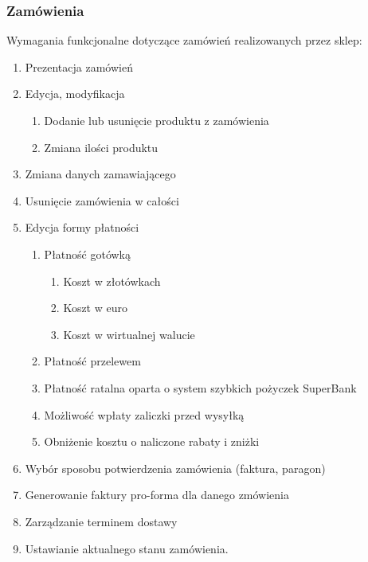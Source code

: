 \subsubsection{Zamówienia}

Wymagania funkcjonalne dotyczące zamówień realizowanych przez sklep:

\begin{enumerate}
  \item Prezentacja zamówień
  \item Edycja, modyfikacja
  \begin{enumerate}
    \item Dodanie lub usunięcie produktu z zamówienia
    \item Zmiana ilości produktu
  \end{enumerate}
  \item Zmiana danych zamawiającego
  \item Usunięcie zamówienia w całości
  \item Edycja formy płatności
  \begin{enumerate}
    \item Płatność gotówką
    \begin{enumerate}
      \item Koszt w złotówkach
      \item Koszt w euro
      \item Koszt w wirtualnej walucie
    \end{enumerate}
    \item Płatność przelewem
    \item Płatność ratalna oparta o system szybkich pożyczek SuperBank
    \item Możliwość wpłaty zaliczki przed wysyłką
    \item Obniżenie kosztu o naliczone rabaty i zniżki
  \end{enumerate}
  \item Wybór sposobu potwierdzenia zamówienia (faktura, paragon)
  \item Generowanie faktury pro-forma dla danego zmówienia
  \item Zarządzanie terminem dostawy
  \item Ustawianie aktualnego stanu zamówienia.
\end{enumerate}